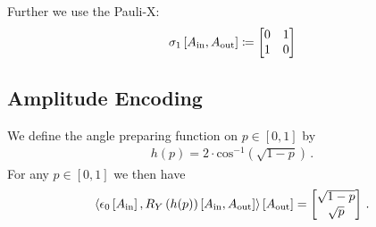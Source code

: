 \documentclass[aps,onecolumn,nofootinbib,pra]{article}
\newtheorem{definition}{Definition}
\begin{document}
    Further we use the Pauli-X:
    \begin{align*}
        \sigma_1\left[A_{\mathrm{in}},A_{\mathrm{out}}\right] \coloneqq
        \begin{bmatrix}
            0 & 1 \\
            1 & 0
        \end{bmatrix}
    \end{align*}


%

    \subsection{Amplitude Encoding}

    We define the angle preparing function on $p\in[0,1]$ by
    \begin{align*}
        h(p) = 2 \cdot \mathrm{cos}^{-1}\left(\sqrt{1-p}\right) \, .
    \end{align*}
    For any $p\in[0,1]$ we then have
    \begin{align*}
        \left\langle \epsilon_{0}\left[A_{\mathrm{in}}\right],R_Y\left({h(p)}\right)\left[A_{\mathrm{in}},A_{\mathrm{out}}\right]\right\rangle \left[ A_{\mathrm{out}} \right]
        = \begin{bmatrix}
              \sqrt{1-p} \\
              \sqrt{p}
        \end{bmatrix} \, .
    \end{align*}
\end{document}

